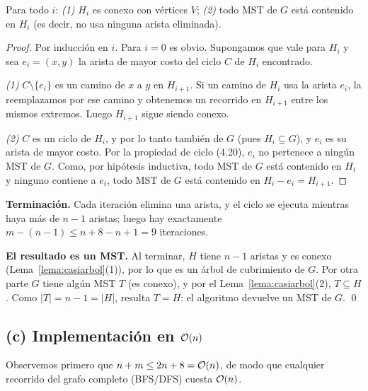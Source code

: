 \begin{lema}\label{lema:casiarbol}
Para todo $i$: \emph{(1)} $H_i$ es conexo con vértices $V$; \emph{(2)} todo MST de $G$ está contenido en $H_i$ (es decir, no usa ninguna arista eliminada).
\end{lema}
\begin{proof}
Por inducción en $i$. Para $i=0$ es obvio. Supongamos que vale para $H_i$ y sea $e_i=(x,y)$ la arista de mayor costo del ciclo $C$ de $H_i$ encontrado.

\emph{(1)} $C\setminus\{e_i\}$ es un camino de $x$ a $y$ en $H_{i+1}$. Si un camino de $H_i$ usa la arista $e_i$, la reemplazamos por ese camino y obtenemos un recorrido en $H_{i+1}$ entre los mismos extremos. Luego $H_{i+1}$ sigue siendo conexo.

\emph{(2)} $C$ es un ciclo de $H_i$, y por lo tanto también de $G$ (pues $H_i\subseteq G$), y $e_i$ es su arista de mayor costo. Por la propiedad de ciclo (4.20), $e_i$ no pertenece a ningún MST de $G$. Como, por hipótesis inductiva, todo MST de $G$ está contenido en $H_i$ y ninguno contiene a $e_i$, todo MST de $G$ está contenido en $H_i-e_i=H_{i+1}$.
\end{proof}

\textbf{Terminación.} Cada iteración elimina una arista, y el ciclo se ejecuta mientras haya más de $n-1$ aristas; luego hay exactamente $m-(n-1)\le n+8-n+1=9$ iteraciones.

\textbf{El resultado es un MST.} Al terminar, $H$ tiene $n-1$ aristas y es conexo (Lema~\ref{lema:casiarbol}(1)), por lo que es un árbol de cubrimiento de $G$. Por otra parte $G$ tiene algún MST $T$ (es conexo), y por el Lema~\ref{lema:casiarbol}(2), $T\subseteq H$. Como $|T|=n-1=|H|$, resulta $T=H$: el algoritmo devuelve un MST de $G$. \qed

\subsection*{(c) Implementación en $\mathcal{O}(n)$}

Observemos primero que $n+m\le 2n+8=\mathcal{O}(n)$, de modo que cualquier recorrido del grafo completo (BFS/DFS) cuesta $\mathcal{O}(n)$.

